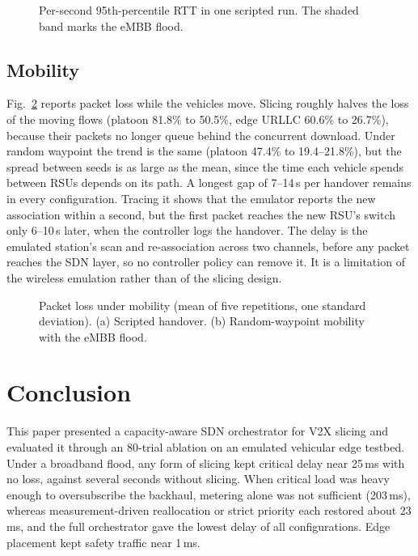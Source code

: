 \documentclass[conference]{IEEEtran}
\begin{document}
\begin{figure}[t]
\centering

\caption{Per-second 95th-percentile RTT in one scripted run. The shaded band marks the eMBB flood.}
\label{fig:timeline}
\end{figure}

\subsection{Mobility}
Fig.~\ref{fig:mobility} reports packet loss while the vehicles move. Slicing roughly halves the loss of the moving flows (platoon 81.8\% to 50.5\%, edge URLLC 60.6\% to 26.7\%), because their packets no longer queue behind the concurrent download. Under random waypoint the trend is the same (platoon 47.4\% to 19.4--21.8\%), but the spread between seeds is as large as the mean, since the time each vehicle spends between RSUs depends on its path. A longest gap of 7--14\,s per handover remains in every configuration. Tracing it shows that the emulator reports the new association within a second, but the first packet reaches the new RSU's switch only 6--10\,s later, when the controller logs the handover. The delay is the emulated station's scan and re-association across two channels, before any packet reaches the SDN layer, so no controller policy can remove it. It is a limitation of the wireless emulation rather than of the slicing design.

\begin{figure}[t]
\centering

\caption{Packet loss under mobility (mean of five repetitions, one standard deviation). (a) Scripted handover. (b) Random-waypoint mobility with the eMBB flood.}
\label{fig:mobility}
\end{figure}

\section{Conclusion}

This paper presented a capacity-aware SDN orchestrator for V2X slicing and evaluated it through an 80-trial ablation on an emulated vehicular edge testbed. Under a broadband flood, any form of slicing kept critical delay near 25\,ms with no loss, against several seconds without slicing. When critical load was heavy enough to oversubscribe the backhaul, metering alone was not sufficient (203\,ms), whereas measurement-driven reallocation or strict priority each restored about 23\,ms, and the full orchestrator gave the lowest delay of all configurations. Edge placement kept safety traffic near 1\,ms.
\end{document}
